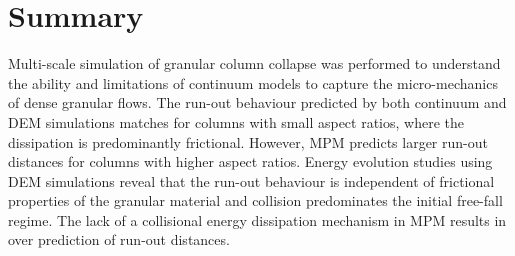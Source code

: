 \section{Summary}
Multi-scale simulation of granular column collapse was performed to understand 
the ability and limitations of continuum models to capture the micro-mechanics 
of dense granular flows. The run-out behaviour predicted by both continuum and 
DEM simulations matches for columns with small aspect ratios, where the 
dissipation is predominantly frictional. However, MPM predicts larger run-out 
distances for columns with higher aspect ratios. Energy evolution studies using 
DEM simulations reveal that the run-out behaviour is independent of frictional 
properties of the granular material and collision predominates the initial 
free-fall regime. The lack of a collisional energy dissipation mechanism in MPM 
results in over prediction of run-out distances. 
